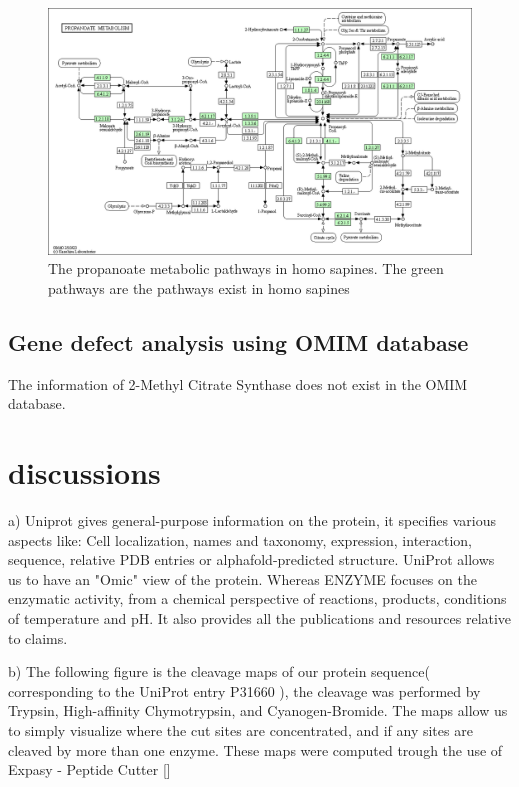 \documentclass[a4paper,english,12pt,bibliography=totoc]{scrreprt}
\begin{document}
\begin{figure}[H]
    \centering
    \includegraphics[width=0.9\linewidth]{Project 2/Kegg pathways/propanoate metabolism in hs.png}
    \caption{The propanoate metabolic pathways in homo sapines. The green pathways are the pathways exist in homo sapines}
\end{figure}

\subsection{Gene defect analysis using OMIM database}
The information of 2-Methyl Citrate Synthase does not exist in the OMIM database. 
\section{discussions}

a) Uniprot gives general-purpose information on the protein, it specifies various aspects like: Cell localization, names and taxonomy, expression, interaction,  sequence, relative PDB entries or alphafold-predicted structure. UniProt allows us to have an "Omic" view of the protein. Whereas ENZYME focuses on the enzymatic activity, from a chemical perspective of reactions, products, conditions of temperature and pH. It also provides all the publications and resources relative to claims.

b) The following figure is the cleavage maps of our protein sequence( corresponding to the UniProt entry P31660 ), the cleavage was performed by Trypsin, High-affinity Chymotrypsin, and Cyanogen-Bromide.
The maps allow us to simply visualize where the cut sites are concentrated, and if any sites are cleaved by more than one enzyme.
These maps were computed trough the use of Expasy - Peptide Cutter [\cite{PeptideProerty}]
\end{document}
